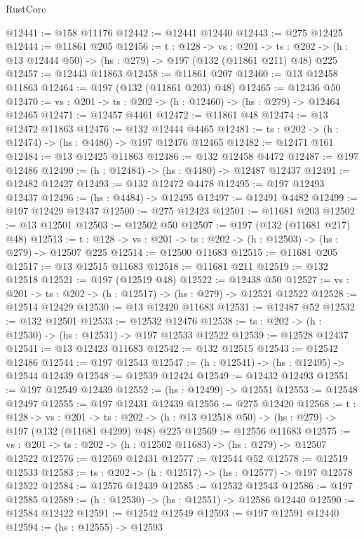 \begin{lexlean}{RustCore}
\begin{coremodule}
@12441 := @158 @11176
@12442 := @12441 @12440
@12443 := @275 @12425
@12444 := @11861 @205
@12456 := {t : @128} ->
  {vs : @201} ->
  {ts : @202} -> (h : @13 @12444 @50) -> (hs : @279) -> @197 (@132 (@11861 @211) @48) @225
@12457 := @12443 @11863
@12458 := @11861 @207
@12460 := @13 @12458 @11863
@12464 := @197 (@132 (@11861 @203) @48)
@12465 := @12436 @50
@12470 := {vs : @201} -> {ts : @202} -> (h : @12460) -> (hs : @279) -> @12464 @12465
@12471 := @12457 @4461
@12472 := @11861 @48
@12474 := @13 @12472 @11863
@12476 := @132 @12444 @4465
@12481 := {ts : @202} -> (h : @12474) -> (hs : @4486) -> @197 @12476 @12465
@12482 := @12471 @161
@12484 := @13 @12425 @11863
@12486 := @132 @12458 @4472
@12487 := @197 @12486
@12490 := (h : @12484) -> (hs : @4480) -> @12487 @12437
@12491 := @12482 @12427
@12493 := @132 @12472 @4478
@12495 := @197 @12493 @12437
@12496 := (hs : @4484) -> @12495
@12497 := @12491 @4482
@12499 := @197 @12429 @12437
@12500 := @275 @12423
@12501 := @11681 @203
@12502 := @13 @12501
@12503 := @12502 @50
@12507 := @197 (@132 (@11681 @217) @48)
@12513 := {t : @128} -> {vs : @201} -> {ts : @202} -> (h : @12503) -> (hs : @279) -> @12507 @225
@12514 := @12500 @11683
@12515 := @11681 @205
@12517 := @13 @12515 @11683
@12518 := @11681 @211
@12519 := @132 @12518
@12521 := @197 (@12519 @48)
@12522 := @12438 @50
@12527 := {vs : @201} -> {ts : @202} -> (h : @12517) -> (hs : @279) -> @12521 @12522
@12528 := @12514 @12429
@12530 := @13 @12420 @11683
@12531 := @12487 @52
@12532 := @132 @12501
@12533 := @12532 @12476
@12538 := {ts : @202} -> (h : @12530) -> (hs : @12531) -> @197 @12533 @12522
@12539 := @12528 @12437
@12541 := @13 @12423 @11683
@12542 := @132 @12515
@12543 := @12542 @12486
@12544 := @197 @12543
@12547 := (h : @12541) -> (hs : @12495) -> @12544 @12439
@12548 := @12539 @12424
@12549 := @12432 @12493
@12551 := @197 @12549 @12439
@12552 := (hs : @12499) -> @12551
@12553 := @12548 @12497
@12555 := @197 @12431 @12439
@12556 := @275 @12420
@12568 := {t : @128} ->
  {vs : @201} ->
  {ts : @202} -> (h : @13 @12518 @50) -> (hs : @279) -> @197 (@132 (@11681 @4299) @48) @225
@12569 := @12556 @11683
@12575 := {vs : @201} -> {ts : @202} -> (h : @12502 @11683) -> (hs : @279) -> @12507 @12522
@12576 := @12569 @12431
@12577 := @12544 @52
@12578 := @12519 @12533
@12583 := {ts : @202} -> (h : @12517) -> (hs : @12577) -> @197 @12578 @12522
@12584 := @12576 @12439
@12585 := @12532 @12543
@12586 := @197 @12585
@12589 := (h : @12530) -> (hs : @12551) -> @12586 @12440
@12590 := @12584 @12422
@12591 := @12542 @12549
@12593 := @197 @12591 @12440
@12594 := (hs : @12555) -> @12593

\end{coremodule}
\end{lexlean}
